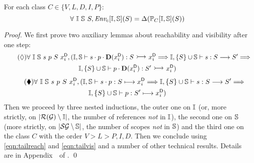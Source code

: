 \begin{lemma}
\label{lemma:pathset-alg}
For each class $C \in \{V,L,D,I,P\}$:\vspace*{-.3\baselineskip}
$$ \forall\ \mathbb{I}\ \mathbb{S}\ S, \mbox{\it{Env}}_{c}[\mathbb{I},\mathbb{S}](S) = \Delta(\mathbb{P}_{C}[\mathbb{I},\mathbb{S}](S))$$
\end{lemma}


\begin{proof} 
We first prove two auxiliary lemmas about reachability and visibility after one step:
\begin{multline}\label{eqn:tailreach}\tag{$\lozenge$}
   \forall\ \seeni\ \seens\ s\ p\ S\ \di{x}{i},
   (\seeni,\seens \vdash s \cdot p\cdot\dstep{\di{x}{i}} : S \reach \di{x}{i} \Longrightarrow
   \seeni,\{S\}\cup\seens \vdash s : S \edge S' \Longrightarrow\\ 
   \seeni,\{S\}\cup\seens \vdash p\cdot\dstep{\di{x}{i}} : S' \reach \di{x}{i})    
  \end{multline}\vspace*{-8mm}
\begin{multline}\label{eqn:tailvis}\tag{$\blacklozenge$}
  \forall\ \mathbb{I}\ \mathbb{S}\ s\ p\ S\ {x}^{\mbox{\scriptsize\sf D}}_{i},
  (\mathbb{I},\mathbb{S} \vdash s \cdot p : S \longmapsto {x}^{\mbox{\scriptsize\sf D}}_{i} \Longrightarrow 
  \mathbb{I},\{S\}\cup\mathbb{S} \vdash s : S \stackrel{}{\longrightarrow} S' \Longrightarrow\\ 
  \mathbb{I},\{S\}\cup\mathbb{S} \vdash p : S' \longmapsto {x}^{\mbox{\scriptsize\sf D}}_{i})  
\end{multline}
Then we proceed by three nested inductions, 
the outer one on $\mathbb{I}$ (or, more strictly, on \mbox{$|\mathcal{R}(\mathcal{G}) \setminus \mathbb{I}|$}, the number of references
\emph{not} in $\mathbb{I}$), the second one on $\mathbb{S}$ (more strictly, on \mbox{$|\mathcal{S}{\mathcal{G}} \setminus \mathbb{S}|$}, the number of 
scopes \emph{not} in $\mathbb{S}$) and the third one on the class $C$ with the order $V > L > {P,I,D}$. Then we conclude using \ref{eqn:tailreach} and \ref{eqn:tailvis} and a number of other technical results. Details are in Appendix~\ of \cite{TUD-SERG-2015-001-local}. \qed
\end{proof}

